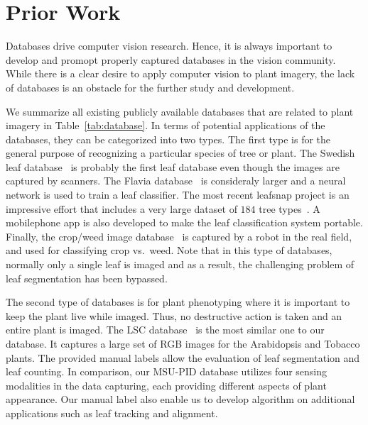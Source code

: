 \section{Prior Work} 
\label{sec:prior}

Databases drive computer vision research.
Hence, it is always important to develop and promopt properly captured databases in the vision community.
While there is a clear desire to apply computer vision to plant imagery, the lack of databases is an obstacle for the further study and development.


We summarize all existing publicly available databases that are related to plant imagery in Table~\ref{tab:database}.
In terms of potential applications of the databases, they can be categorized into two types.
The first type is for the general purpose of recognizing a particular species of tree or plant.
The Swedish leaf database~\cite{soderkvist2001computer} is probably the first leaf database even though the images are captured by scanners. 
The Flavia database~\cite{wu2007leaf} is consideraly larger and a neural network is used to train a leaf classifier.
The most recent leafsnap project is an impressive effort that includes a very large dataset of $184$ tree types~\cite{kumar2012leafsnap}.
A mobilephone app is also developed to make the leaf classification system portable.
Finally, the crop/weed image database~\cite{haug2014crop} is captured by a robot in the real field, and used for classifying crop vs.~weed.
Note that in this type of databases, normally only a single leaf is imaged and as a result, the challenging problem of leaf segmentation has been bypassed.


The second type of databases is for plant phenotyping where it is important to keep the plant live while imaged.
Thus, no destructive action is taken and an entire plant is imaged.
The LSC database~\cite{scharr2014annotated} is the most similar one to our database.
It captures a large set of RGB images for the Arabidopsis and Tobacco plants.
The provided manual labels allow the evaluation of leaf segmentation and leaf counting.
In comparison, our MSU-PID database utilizes four sensing modalities in the data capturing, each providing different aspects of plant appearance.
Our manual label also enable us to develop algorithm on additional applications such as leaf tracking and alignment. 

